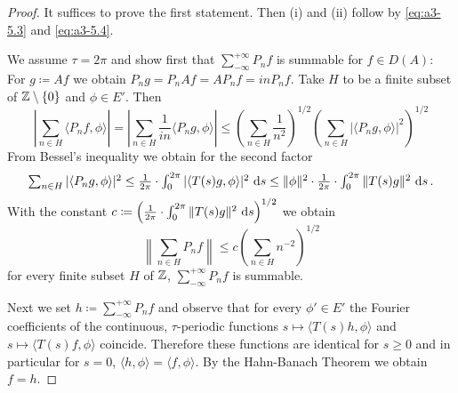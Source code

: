 \begin{proof}
It suffices to prove the first statement. Then (i) and (ii) follow by \eqref{eq:a3-5.3} and \eqref{eq:a3-5.4}.

We assume $\tau = 2\pi$ and show first that $\sum_{-\infty}^{+\infty} P_{n}f$ is summable for $f \in D(A)$: For $g \coloneqq Af$ we obtain $P_{n}g = P_{n}Af = AP_{n}f = inP_{n}f$.
Take $H$ to be a finite subset of $\mathbb{Z} \setminus \{0\}$ and $\phi \in E'$. Then
\[\textstyle
\left|\sum_{n \in H} \langle P_{n}f,\phi \rangle\right|
= \left|\sum_{n \in H} \frac{1}{in} \langle P_{n}g,\phi \rangle\right| 
\leq \left(\sum_{n \in H} \frac{1}{n^2}\right)^{1/2}\left(\sum_{n \in H} |\langle P_{n}g,\phi \rangle|^{2}\right)^{1/2}
\]
From Bessel's inequality we obtain for the second factor
\[\textstyle
\sum_{n \in H} |\langle P_{n}g,\phi \rangle|^{2} \leq \frac{1}{2\pi} \cdot \int_{0}^{2\pi} |\langle T(s)g,\phi \rangle|^{2} \, \mathop{}\!\mathrm{d}{s} 
\leq \|\phi\|^{2} \cdot \frac{1}{2\pi} \cdot \int_{0}^{2\pi} \|T(s)g\|^{2} \, \mathop{}\!\mathrm{d}{s} \,.
\]
With the constant $c \coloneqq \left(\frac{1}{2\pi} \cdot \int_{0}^{2\pi} \|T(s)g\|^{2} \, \mathop{}\!\mathrm{d}{s}\right)^{1/2}$ we obtain
\[\textstyle
\left\|\sum_{n \in H} P_{n}f\right\| \leq c\left(\sum_{n \in H} n^{-2}\right)^{1/2}
\]
for every finite subset $H$ of $\mathbb{Z}$, \ie $\sum_{-\infty}^{+\infty} P_{n}f$ is summable.

Next we set $h \coloneqq \sum_{-\infty}^{+\infty} P_{n}f$ and observe that for every $\phi' \in E'$ the Fourier coefficients of the continuous, $\tau$-periodic functions
$s \mapsto \langle T(s)h,\phi \rangle$ and $s \mapsto \langle T(s)f,\phi \rangle$
coincide.
Therefore these functions are identical for $s \geq 0$ and in particular for $s = 0$, \ie $\langle h,\phi \rangle = \langle f,\phi \rangle$.
By the Hahn-Banach Theorem we obtain $f = h$.
\end{proof}


